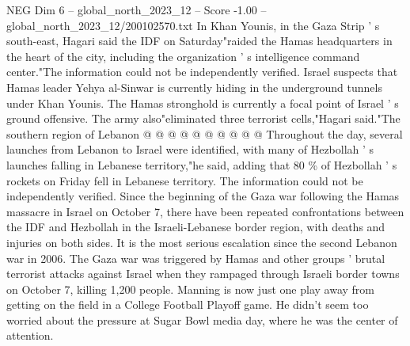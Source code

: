 \begin{textsample}{NEG Dim 6 – global\_north\_2023\_12 – Score -1.00 – global\_north\_2023\_12/200102570.txt}
In Khan Younis, in the Gaza Strip ' s south-east, Hagari said the IDF on Saturday"raided the Hamas headquarters in the heart of the city, including the organization ' s intelligence command center."The information could not be independently verified.
Israel suspects that Hamas leader Yehya al-Sinwar is currently hiding in the underground tunnels under Khan Younis.
The Hamas stronghold is currently a focal point of Israel ' s ground offensive.
The army also"eliminated three terrorist cells,"Hagari said."The southern region of Lebanon @ @ @ @ @ @ @ @ @ @ Throughout the day, several launches from Lebanon to Israel were identified, with many of Hezbollah ' s launches falling in Lebanese territory,"he said, adding that 80 \% of Hezbollah ' s rockets on Friday fell in Lebanese territory.
The information could not be independently verified.
Since the beginning of the Gaza war following the Hamas massacre in Israel on October 7, there have been repeated confrontations between the IDF and Hezbollah in the Israeli-Lebanese border region, with deaths and injuries on both sides.
It is the most serious escalation since the second Lebanon war in 2006.
The Gaza war was triggered by Hamas and other groups ' brutal terrorist attacks against Israel when they rampaged through Israeli border towns on October 7, killing 1,200 people.
Manning is now just one play away from getting on the field in a College Football Playoff game.
He didn't seem too worried about the pressure at Sugar Bowl media day, where he was the center of attention.

\end{textsample}
